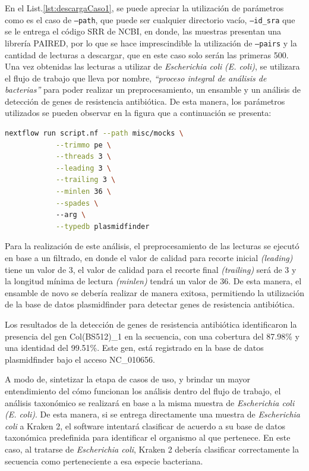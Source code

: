 \documentclass[12pt]{article}
\begin{document}
En el List.\ref{lst:descargaCaso1}, se puede apreciar la utilización de parámetros 
como es el caso de \texttt{--path}, que puede ser cualquier directorio 
vacío, \texttt{--id\_sra} que 
se le entrega el código SRR de NCBI,  en donde, las muestras presentan una librería PAIRED, 
por lo que se hace imprescindible la utilización de \texttt{--pairs} y la cantidad de 
lecturas a 
descargar, que en este caso solo serán las primeras 500. Una vez obtenidas las lecturas a 
utilizar de  \textit{Escherichia coli} \emph{(E. coli)}, se utilizara el 
flujo de trabajo que lleva 
por nombre, \emph{“proceso integral de análisis de bacterias”} para poder realizar un 
preprocesamiento, un ensamble y un análisis de detección de genes de resistencia 
antibiótica. De esta manera, los parámetros utilizados se pueden observar en la figura 
que a continuación se presenta:

\begin{center}
    \begin{lstlisting}[language=bash, caption=Comando para la identificación de ARG de \textit{Escherichia coli} \emph{(elaboración propia)}., label=lst:ARGCaso1]
        nextflow run script.nf --path misc/mocks \
            --trimmo pe \
            --threads 3 \
            --leading 3 \
            --trailing 3 \
            --minlen 36 \
            --spades \ 
            --arg \
            --typedb plasmidfinder
    \end{lstlisting}
\end{center}

Para la realización de este análisis, el preprocesamiento de las lecturas se 
ejecutó en base a un filtrado, en donde el valor de calidad para recorte 
inicial \emph{(leading)} tiene un valor de 3, el valor de calidad para el recorte 
final \emph{(trailing)} será de 3 y  la longitud mínima de lectura \emph{(minlen)}
tendrá un valor de  36. De esta manera, el ensamble de novo se debería 
realizar de manera exitosa, permitiendo la utilización de la base de datos 
plasmidfinder para detectar genes de resistencia antibiótica.

Los resultados de la detección de genes de resistencia antibiótica 
identificaron la presencia del gen Col(BS512)\_1 en la secuencia, con
una cobertura del 87.98\% y una identidad del 99.51\%. Este gen, 
está registrado en la base de datos plasmidfinder bajo el acceso NC\_010656.

A modo de, sintetizar la etapa de casos de uso, y brindar un mayor 
entendimiento del cómo funcionan los análisis dentro del flujo de 
trabajo, el  análisis taxonómico se realizará en base a la misma 
muestra de \textit{Escherichia coli} \emph{(E. coli)}. De esta manera, si se entrega 
directamente una muestra de \textit{Escherichia coli} a Kraken 2, el software 
intentará clasificar de acuerdo a su base de datos taxonómica predefinida 
para identificar el organismo al que pertenece. En este caso, al tratarse 
de \textit{Escherichia coli}, Kraken 2 debería clasificar correctamente la secuencia 
como perteneciente a esa especie bacteriana. 
\end{document}
